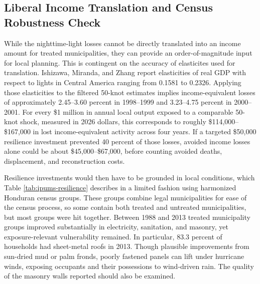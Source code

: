\documentclass[12pt]{article}
\begin{document}
\subsection{Liberal Income Translation and Census Robustness Check}

While the nighttime-light losses cannot be directly translated into an income amount for treated municipalities, they can provide an order-of-magnitude input for local planning. This is contingent on the accuracy of elasticites used for translation. Ishizawa, Miranda, and Zhang report elasticities of real GDP with respect to lights in Central America ranging from 0.1581 to 0.2326. Applying those elasticities to the filtered 50-knot estimates implies income-equivalent losses of approximately 2.45--3.60 percent in 1998--1999 and 3.23--4.75 percent in 2000--2001. For every \$1 million in annual local output exposed to a comparable 50-knot shock, measured in 2026 dollars, this corresponds to roughly \$114,000--\$167,000 in lost income-equivalent activity across four years. If a targeted \$50,000 resilience investment prevented 40 percent of those losses, avoided income losses alone could be about \$45,000--\$67,000, before counting avoided deaths, displacement, and reconstruction costs. 

Resilience investments would then have to be grounded in local conditions, which Table \ref{tab:ipums-resilience} describes 
in a limited fashion using harmonized Honduran census groups. These groups combine legal municipalities for ease of the census process, so some contain both treated and untreated municipalities, but most groups were hit together. Between 1988 and 2013 treated municipality groups improved substantially in electricity, sanitation, and masonry, yet exposure-relevant vulnerability remained. In particular, 83.3 percent of households had sheet-metal roofs in 2013. Though plausible improvements from sun-dried mud or palm fronds, poorly fastened panels can lift under hurricane winds, exposing occupants and their possessions to wind-driven rain. The quality of the masonry walls reported should also be examined. 
\end{document}
